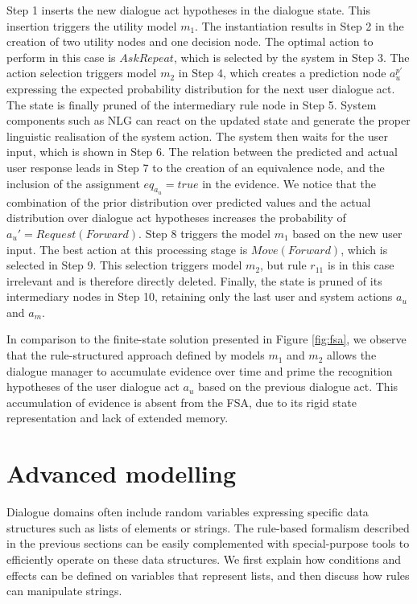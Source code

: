 Step 1 inserts the new dialogue act hypotheses in the dialogue state.  This insertion triggers 
the utility model $m_1$. The instantiation results in Step 2 in the creation of two utility nodes and one decision node.  The optimal action to perform in this case is $\mathit{AskRepeat}$, which is selected by the system in Step 3. The action selection triggers model $m_2$ in Step 4, which creates a prediction node $a_{u}^{p\prime}$ expressing the expected probability distribution for the next user dialogue act. The state is finally pruned of the intermediary rule node in Step 5.  System components such as NLG can react on the updated state and generate the proper linguistic realisation of the system action. The system then waits for the user input, which is shown in Step 6.  The relation between the predicted and actual user response leads in Step 7 to the creation of an equivalence node, and the inclusion of the assignment $\mathit{eq}_{a_u} = true$ in the evidence. We notice that the combination of the prior distribution over predicted values and the actual distribution over dialogue act hypotheses increases the probability of $a_u' = \mathit{Request(Forward)}$. Step 8 triggers the model $m_1$ based on the new user input.  The best action at this processing stage is $\mathit{Move(Forward)}$, which is selected in Step 9.  This selection triggers model $m_2$, but rule $r_{11}$ is in this case irrelevant and is therefore directly deleted. Finally, the state is pruned of its intermediary nodes in Step 10, retaining only the last user and system actions $a_u$ and $a_m$. 

In comparison to the finite-state solution presented in Figure \ref{fig:fsa}, we observe that the rule-structured approach defined by models $m_1$ and $m_2$ allows the dialogue manager to accumulate evidence over time and prime the recognition hypotheses of the user dialogue act $a_u$ based on the previous dialogue act.  This accumulation of evidence is absent from the FSA, due to its rigid state representation and lack of extended memory. 

\section{Advanced modelling}
\label{sec:amodelling}

Dialogue domains often include random variables expressing specific data structures such as lists of elements or strings. The rule-based formalism described in the previous sections can be easily complemented with special-purpose tools to efficiently operate on these data structures. We first explain how conditions and effects can be defined on variables that represent lists, and then discuss how rules can manipulate strings. 

